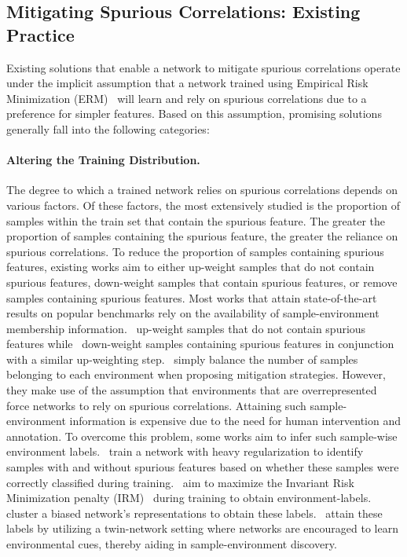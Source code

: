\vspace{0.1in}
\subsection{Mitigating Spurious Correlations: Existing Practice}

Existing solutions that enable a network to mitigate spurious correlations operate under the implicit assumption that a network trained using Empirical Risk Minimization (ERM)~\cite{Vapnik98} will learn and rely on spurious correlations due to a preference for simpler features. Based on this assumption, promising solutions generally fall into the following categories:


\paragraph{Altering the Training Distribution. } The degree to which a trained network relies on spurious correlations depends on various factors. Of these factors, the most extensively studied is the proportion of samples within the train set that contain the spurious feature. The greater the proportion of samples containing the spurious feature, the greater the reliance on spurious correlations. To reduce the proportion of samples containing spurious features, existing works aim to either up-weight samples that do not contain spurious features, down-weight samples that contain spurious features, or remove samples containing spurious features. Most works that attain state-of-the-art results on popular benchmarks rely on the availability of sample-environment membership information.~\cite{Liu2021ICML} up-weight samples that do not contain spurious features while~\cite{Yang2024AISTATS} down-weight samples containing spurious features in conjunction with a similar up-weighting step.~\cite{Kirichenko2023ICLR,Deng2023Neurips} simply balance the number of samples belonging to each environment when proposing mitigation strategies. However, they make use of the assumption that environments that are overrepresented force networks to rely on spurious correlations. Attaining such sample-environment information is expensive due to the need for human intervention and annotation. To overcome this problem, some works aim to infer such sample-wise environment labels.~\cite{Liu2021ICML} train a network with heavy regularization to identify samples with and without spurious features based on whether these samples were correctly classified during training.~\cite{Ahmed2021ICLR} aim to maximize the Invariant Risk Minimization penalty (IRM)~\cite{Arjovsky2019} during training to obtain environment-labels.~\cite{Zhang2022ICML} cluster a biased network's representations to obtain these labels.~\cite{pezeshki2024ICML} attain these labels by utilizing a twin-network setting where networks are encouraged to learn environmental cues, thereby aiding in sample-environment discovery.


